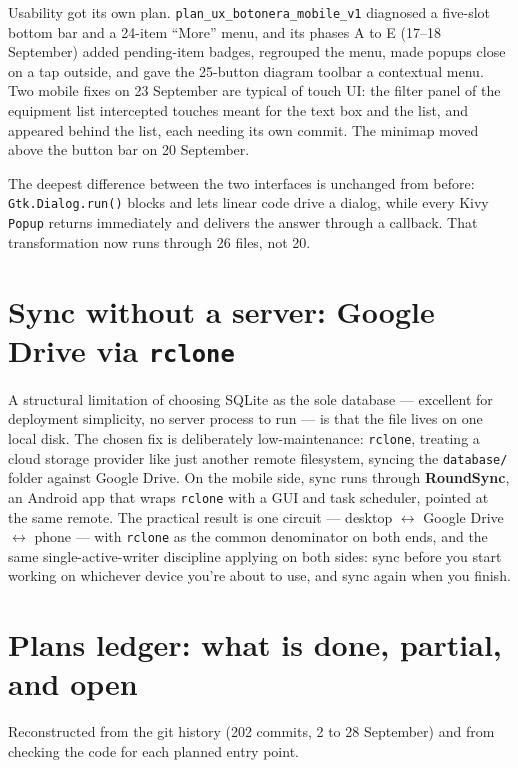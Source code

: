 \documentclass[10.4pt,twocolumn]{article}
\begin{document}
Usability got its own plan. \texttt{plan\_ux\_botonera\_mobile\_v1} diagnosed a five-slot bottom bar and a 24-item ``More'' menu, and its phases A to E (17--18 September) added pending-item badges, regrouped the menu, made popups close on a tap outside, and gave the 25-button diagram toolbar a contextual menu. Two mobile fixes on 23 September are typical of touch UI: the filter panel of the equipment list intercepted touches meant for the text box and the list, and appeared behind the list, each needing its own commit. The minimap moved above the button bar on 20 September.

The deepest difference between the two interfaces is unchanged from before: \texttt{Gtk.Dialog.run()} blocks and lets linear code drive a dialog, while every Kivy \texttt{Popup} returns immediately and delivers the answer through a callback. That transformation now runs through 26 files, not 20.

\section{Sync without a server: Google Drive via \texttt{rclone}}

A structural limitation of choosing SQLite as the sole database --- excellent for deployment simplicity, no server process to run --- is that the file lives on one local disk. The chosen fix is deliberately low-maintenance: \texttt{rclone}, treating a cloud storage provider like just another remote filesystem, syncing the \texttt{database/} folder against Google Drive. On the mobile side, sync runs through \textbf{RoundSync}, an Android app that wraps \texttt{rclone} with a GUI and task scheduler, pointed at the same remote. The practical result is one circuit --- desktop $\leftrightarrow$ Google Drive $\leftrightarrow$ phone --- with \texttt{rclone} as the common denominator on both ends, and the same single-active-writer discipline applying on both sides: sync before you start working on whichever device you're about to use, and sync again when you finish.

\section{Plans ledger: what is done, partial, and open}
\label{sec:plans}

Reconstructed from the git history (202 commits, 2 to 28 September) and from checking the code for each planned entry point.
\end{document}
